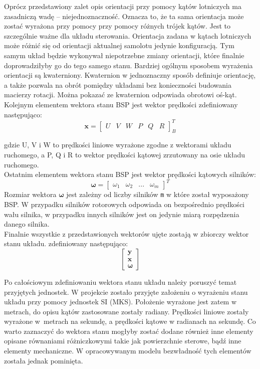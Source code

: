Oprócz przedstawiony zalet opis orientacji przy pomocy kątów lotniczych ma zasadniczą wadę -- niejednoznaczność. Oznacza to, że ta sama orientacja może zostać wyrażona przy pomocy przy pomocy różnych trójek kątów. Jest to szczególnie ważne dla układu sterowania. Orientacja zadana w kątach lotniczych może różnić się od orientacji aktualnej samolotu jedynie konfiguracją. Tym samym układ będzie wykonywał niepotrzebne zmiany orientacji, które finalnie doprowadziłyby go do tego samego stanu. Bardziej ogólnym sposobem wyrażenia orientacji są kwaterniony. Kwaternion w jednoznaczny sposób definiuje orientację, a także pozwala na obrót pomiędzy układami bez konieczności budowania macierzy rotacji. Można pokazać ze kwaternion odpowiada obrotowi oś-kąt.\\

Kolejnym elementem wektora stanu BSP jest wektor prędkości zdefiniowany następująco:
\[
	\bm{x} = \begin{bmatrix}U & V & W &  P & Q & R  \end{bmatrix}^{T}_{B}
 \]
 
 gdzie U, V i W to prędkości liniowe wyrażone zgodne z wektorami układu ruchomego, a P, Q i R to wektor prędkości kątowej zrzutowany na osie układu ruchomego.\\
 
 Ostatnim elementem wektora stanu BSP jest wektor prędkości kątowych silników:
 \[
	\bm{\omega} = \begin{bmatrix}\omega_1 & \omega_2 & ... &  \omega_{m}  \end{bmatrix}^{T}
 \]
 Rozmiar wektora $\bm{\omega}$ jest zależny od liczby silników \texttt{m} w które został wyposażony BSP. W przypadku silników rotorowych odpowiada on bezpośrednio prędkości wału silnika, w przypadku innych silników jest on jedynie miarą rozpędzenia danego silnika.\\
 
Finalnie wszystkie z przedstawionych wektorów ujęte zostają w zbiorczy wektor stanu układu. zdefiniowany następująco:
\[
      	\begin{bmatrix} \bm{y}\\ \bm{x} \\  \bm{\omega} \end{bmatrix}
\]

Po całościowym zdefiniowaniu wektora stanu układu należy poruszyć temat przyjętych jednostek. W projekcie zostało przyjęte założeniu o wyrażeniu stanu układu przy pomocy jednostek SI (MKS). Położenie wyrażone jest zatem w metrach, do opisu kątów zastosowane zostały radiany. Prędkości liniowe zostały wyrażone w~metrach na sekundę, a prędkości kątowe w radianach na sekundę.
Co warto zaznaczyć do wektora stanu mogłyby zostać dodane również inne elementy opisane równaniami różniczkowymi takie jak powierzchnie sterowe, bądź inne elementy mechaniczne. W opracowywanym modelu bezwładność tych elementów została jednak pominięta.

